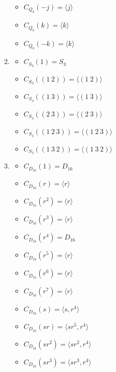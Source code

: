 \begin{solution}
\begin{enumerate}[label = \textbf{(\alph*)}]
\begin{multicols}{3}
\begin{itemize}
            \item $C_{Q_8}(-j) = \langle j \rangle$
            \item $C_{Q_8}(k) = \langle k \rangle$
            \item $C_{Q_8}(-k) = \langle k \rangle$
        \end{itemize}
        \end{multicols}
    \item \begin{multicols}{2}\begin{itemize}
            \item $C_{S_3}(1) = S_3$
            \item $C_{S_3}((1 \ 2)) = \langle (1 \ 2) \rangle$
            \item $C_{S_3}((1 \ 3)) = \langle (1 \ 3) \rangle$
            \item $C_{S_3}((2 \ 3)) = \langle (2 \ 3) \rangle$
            \item $C_{S_3}((1 \ 2 \ 3)) = \langle (1 \ 2 \ 3) \rangle$
            \item $C_{S_3}((1 \ 3 \ 2)) = \langle (1 \ 3 \ 2) \rangle$
        \end{itemize}
        \end{multicols}
    \item \begin{multicols}{2}\begin{itemize}
            \item $C_{D_{16}}(1) = D_{16}$
            \item $C_{D_{16}}(r) = \langle r \rangle$
            \item $C_{D_{16}}(r^2) = \langle r \rangle$
            \item $C_{D_{16}}(r^3) = \langle r \rangle$
            \item $C_{D_{16}}(r^4) = D_{16}$
            \item $C_{D_{16}}(r^5) = \langle r \rangle$
            \item $C_{D_{16}}(r^6) = \langle r \rangle$
            \item $C_{D_{16}}(r^7) = \langle r \rangle$
            \item $C_{D_{16}}(s) = \langle s, r^4 \rangle$
            \item $C_{D_{16}}(sr) = \langle sr^5, r^4 \rangle$
            \item $C_{D_{16}}(sr^2) = \langle sr^2, r^4 \rangle$
            \item $C_{D_{16}}(sr^3) = \langle sr^3, r^4 \rangle$

\end{itemize}
\end{multicols}
\end{enumerate}
\end{solution}
